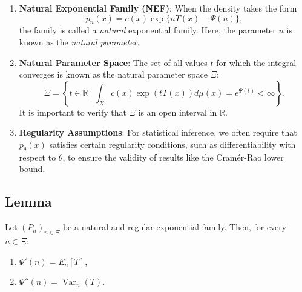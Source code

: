 \documentclass[open=any, 11pt,paper=A4]{scrreprt}
\begin{document}
\begin{enumerate}
    \item \textbf{Natural Exponential Family (NEF)}: When the density takes the form
    \begin{equation}
    p_n(x) = c(x) \exp\{ n T(x) - \Psi(n) \},
    \end{equation}
    the family is called a \emph{natural} exponential family. Here, the parameter $n$ is known as the \emph{natural parameter}.

    \item \textbf{Natural Parameter Space}: The set of all values $t$ for which the integral converges is known as the natural parameter space $\Xi$:
    \begin{equation}
    \Xi = \left\{ t \in \mathbb{R} \ \bigg| \ \int_X c(x) \exp\left( t T(x) \right) d\mu(x) = e^{\Psi(t)} < \infty \right\}.
    \end{equation}
    It is important to verify that $\Xi$ is an open interval in $\mathbb{R}$.

    \item \textbf{Regularity Assumptions}: For statistical inference, we often require that $p_\theta(x)$ satisfies certain regularity conditions, such as differentiability with respect to $\theta$, to ensure the validity of results like the Cramér-Rao lower bound.
\end{enumerate}

\subsection{Lemma}

\begin{lemma}
Let $(P_n)_{n \in \Xi}$ be a natural and regular exponential family. Then, for every $n \in \Xi$:
\begin{enumerate}
    \item $\Psi'(n) = E_n[T]$,
    \item $\Psi''(n) = \operatorname{Var}_n(T)$.
\end{enumerate}
\end{lemma}
\end{document}

